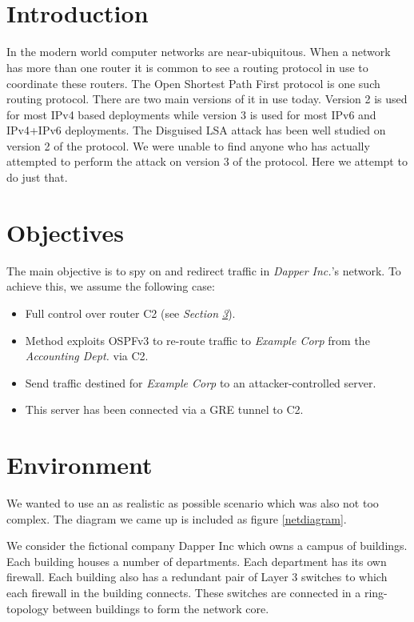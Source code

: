 \documentclass[11pt,a4paper,oneside]{article}
\title{\ftitle\\\coursecode { -} \coursename}
\author{\fauthor}
\newcommand{\lsection}[2]{\section{#1}\label{sec:#2}}
\begin{document}
    \maketitle\thispagestyle{fancy}
    \newpage
    \tableofcontents
    \newpage


    \lsection{Introduction}{intro}
    In the modern world computer networks are near-ubiquitous.
    When a network has more than one router it is common to see a routing protocol in use to coordinate these routers.
    The Open Shortest Path First protocol is one such routing protocol.
    There are two main versions of it in use today.
    Version 2 is used for most IPv4 based deployments while version 3 is used for most IPv6 and IPv4+IPv6 deployments.
    The Disguised LSA attack has been well studied on version 2 of the protocol.
    We were unable to find anyone who has actually attempted to perform the attack on version 3 of the protocol.
    Here we attempt to do just that.


    \lsection{Objectives}{objectives}
    The main objective is to spy on and redirect traffic in \textit{Dapper Inc.}'s network. To achieve this, we assume the following case:
    \begin{itemize}
        \item Full control over router C2 (see \textit{Section \ref{sec:env_setup}}).
        \item Method exploits OSPFv3 to re-route traffic to \textit{Example Corp} from the \textit{Accounting Dept.} via C2.
        \item Send traffic destined for \textit{Example Corp} to an attacker-controlled server.
        \item This server has been connected via a GRE tunnel to C2.
    \end{itemize}


    \lsection{Environment}{env_setup}
    		We wanted to use an as realistic as possible scenario which was also not too complex.
            The diagram we came up is included as figure \ref{netdiagram}.
    		
    		We consider the fictional company Dapper Inc which owns a campus of buildings.
            Each building houses a number of departments.
            Each department has its own firewall.
            Each building also has a redundant pair of Layer 3 switches to which each firewall in the building connects.
            These switches are connected in a ring-topology between buildings to form the network core.
\end{document}
